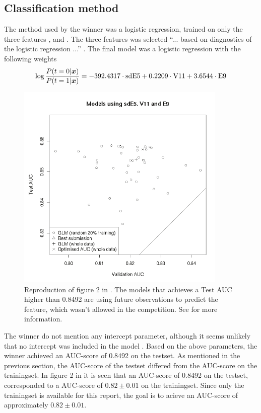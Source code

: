 \subsection{Classification method}
The method used by the winner was a logistic regression, trained on only the three features ,  and . The three features was selected ``... based on diagnostics of the logistic regression ...'' \citep[p.3]{inference_winning_approach}. The final model was a logistic regression with the following weights
\[
    \log\frac{P(t=0|\boldsymbol{x})}{P(t=1|\boldsymbol{x})} = -392.4317\cdot\text{sdE5} + 0.2209\cdot\text{V11} + 3.6544\cdot\text{E9}
\]
\begin{figure}\label{fig:auc-score-inference-paper}
    \centering
    \includegraphics[width=100mm]{media/fig2-inference-paper.pdf}
    \caption{Reproduction of figure 2 in \citet{inference_winning_approach}. The models that achieves a Test AUC higher than 0.8492 are using future observations to predict the  feature, which wasn't allowed in the competition. See \citet{inference_winning_approach} for more information.}
\end{figure}
The winner do not mention any intercept parameter, although it seems unlikely that no intercept was included in the model \citep{meetings-morten}. Based on the above parameters, the winner achieved an AUC-score of 0.8492 on the testset. As mentioned in the previous section, the AUC-score of the testset differed from the AUC-score on the trainingset. In figure 2 in \citet{inference_winning_approach}  it is seen that an AUC-score of 0.8492 on the testset, corresponded to a AUC-score of $0.82\pm0.01$ on the trainingset. Since only the trainingset is available for this report, the goal is to acieve an AUC-score of approximately $0.82\pm0.01$.

